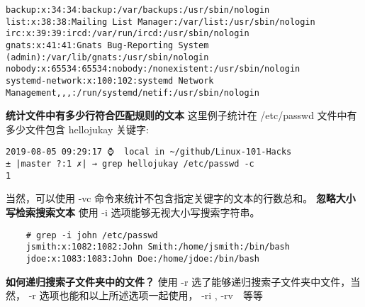 \documentclass[UTF8]{ctexart}
\begin{document}
\begin{lstlisting}
backup:x:34:34:backup:/var/backups:/usr/sbin/nologin                                                                                                                          
list:x:38:38:Mailing List Manager:/var/list:/usr/sbin/nologin                                                                                                                 
irc:x:39:39:ircd:/var/run/ircd:/usr/sbin/nologin                                                                                                                              
gnats:x:41:41:Gnats Bug-Reporting System (admin):/var/lib/gnats:/usr/sbin/nologin                                                                                             
nobody:x:65534:65534:nobody:/nonexistent:/usr/sbin/nologin                                                                                                                    
systemd-network:x:100:102:systemd Network Management,,,:/run/systemd/netif:/usr/sbin/nologin  
\end{lstlisting}
\textbf{统计文件中有多少行符合匹配规则的文本}\newline
这里例子统计在 /etc/passwd 文件中有多少文件包含 hellojukay 关键字:
\begin{lstlisting}
2019-08-05 09:29:17 ⌚  local in ~/github/Linux-101-Hacks
± |master ?:1 ✗| → grep hellojukay /etc/passwd -c
1    
\end{lstlisting}
当然，可以使用 -vc 命令来统计不包含指定关键字的文本的行数总和。\newline
\textbf{忽略大小写检索搜索文本}\newline
使用 -i 选项能够无视大小写搜索字符串。
\begin{lstlisting}
    # grep -i john /etc/passwd
    jsmith:x:1082:1082:John Smith:/home/jsmith:/bin/bash
    jdoe:x:1083:1083:John Doe:/home/jdoe:/bin/bash
\end{lstlisting}
\textbf{如何递归搜索子文件夹中的文件？}\newline
使用 -r 选了能够递归搜索子文件夹中文件，当然， -r 选项也能和以上所述选项一起使用，
-ri , -rv　等等
\end{document}

